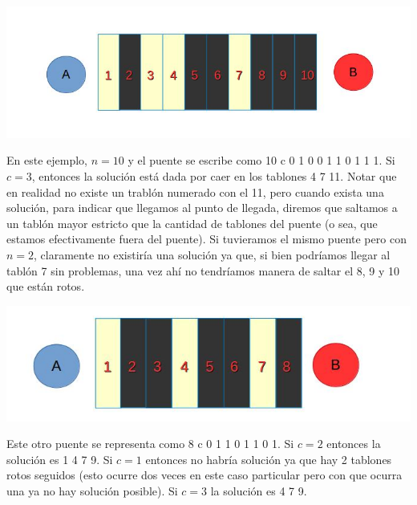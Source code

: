 \documentclass{article}
\begin{document}
\includegraphics[width=\textwidth,height=\textheight,keepaspectratio
]{ejemplopuente1.jpg}
\begin {flushleft}
En este ejemplo, \textit{$n = 10$} y el puente se escribe como 10 c 0 1 0 0 1 1 0 1 1 1.
\newline Si \textit{$c = 3$}, entonces la soluci\'on est\'a dada por caer en los tablones 4 7 11. Notar que en realidad no existe un trabl\'on numerado con el 11, pero cuando exista una soluci\'on, para indicar que llegamos al punto de llegada, diremos que saltamos a un tabl\'on mayor estricto que la cantidad de tablones del puente (o sea, que estamos efectivamente fuera del puente).
Si tuvieramos el mismo puente pero con \textit{$n = 2$}, claramente no existir\'ia una soluci\'on ya que, si bien podr\'iamos llegar al tabl\'on 7 sin problemas, una vez ah\'i no tendr\'iamos manera de saltar el 8, 9 y 10 que est\'an rotos.\end {flushleft}
\vspace{1cm}
\includegraphics[width=\textwidth,height=\textheight,keepaspectratio
]{ejemplopuente2.jpg}
\begin {flushleft}Este otro puente se representa como 8 c 0 1 1 0 1 1 0 1.
\newline Si \textit{$c = 2$} entonces la soluci\'on es 1 4 7 9.
\newline Si \textit{$c = 1$} entonces no habr\'ia soluci\'on ya que hay 2 tablones rotos seguidos (esto ocurre dos veces en este caso particular pero con que ocurra una ya no hay soluci\'on posible).
\newline Si \textit{$c = 3$} la soluci\'on es  4 7 9.
\end {flushleft}
\end{document}
